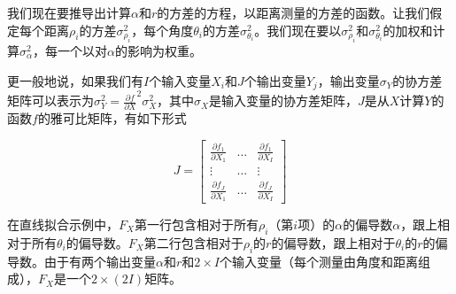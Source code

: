 我们现在要推导出计算$\alpha$和$r$的方差的方程，以距离测量的方差的函数。让我们假定每个距离$\rho_i$的方差$\sigma^2_{\rho_i}$，每个角度$\theta_i$的方差$\sigma^2_{\theta_i}$。我们现在要以$\sigma^2_{\rho_i}$和$\sigma^2_{\theta_i}$的加权和计算$\sigma^2_{\alpha}$，每一个以对$\alpha$的影响为权重。


更一般地说，如果我们有$I$个输入变量$X_i$和$J$个输出变量$Y_j$，输出变量$\sigma_Y$的协方差矩阵可以表示为$\sigma_Y^2=\frac{\partial f}{\partial X}^2\sigma_X^2$，其中$\sigma_X$是输入变量的协方差矩阵，$J$是从$X$计算$Y$的函数$f$的雅可比矩阵，有如下形式

\begin{equation}
J=\left[
\begin{array}{ccc}
  \frac{\partial f_1}{\partial X_1} & \ldots & \frac{\partial f_1}{\partial X_I}\\
  \vdots & \ldots & \vdots\\
  \frac{\partial f_J}{\partial X_1} & \ldots & \frac{\partial f_J}{\partial X_I}
 \end{array}
 \right]
\end{equation}


在直线拟合示例中，$F_X$第一行包含相对于所有$\rho_i$（第$i$项）的$\alpha$的偏导数$\alpha$，跟上相对于所有$\theta_i$的偏导数。$F_X$第二行包含相对于$\rho_i$的$r$的偏导数，跟上相对于$\theta_i$的$r$的偏导数。由于有两个输出变量$\alpha$和$r$和$2\times I$个输入变量（每个测量由角度和距离组成），$F_X$是一个$2\times (2I)$矩阵。



